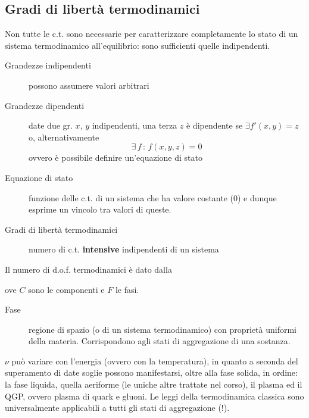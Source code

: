 \documentclass[10pt, oneside]{book}
\begin{document}
\subsection{Gradi di libertà termodinamici}
Non tutte le c.t. sono necessarie per caratterizzare completamente lo stato di un sistema termodinamico all'equilibrio: sono sufficienti quelle indipendenti.
\begin{description}
\item[Grandezze indipendenti] possono assumere valori arbitrari
\item[Grandezze dipendenti] date due gr. $x$, $y$ indipendenti, una terza $z$ è dipendente se $\exists f'(x,y) = z$ o, alternativamente
\[\exists \, f \, : \, f(x,y,z) = 0\]
ovvero è possibile definire un'equazione di stato
\item[Equazione di stato] funzione delle c.t. di un sistema che ha valore costante ($0$) e dunque esprime un vincolo tra valori di queste.
\item[Gradi di libertà termodinamici] numero di c.t. \textbf{intensive} indipendenti di un sistema
\end{description}
Il numero di d.o.f. termodinamici è dato dalla 
\begin{center}

\end{center}
ove $C$ sono le componenti e $F$ le fasi.
\begin{description}
\item[Fase] regione di spazio (o di un sistema termodinamico) con proprietà uniformi della materia. Corrispondono agli stati di aggregazione di una sostanza.
\end{description}
$\nu$ può variare con l'energia (ovvero con la temperatura), in quanto a seconda del superamento di date soglie possono manifestarsi, oltre alla fase solida, in ordine: la fase liquida, quella aeriforme (le uniche altre trattate nel corso), il plasma ed il QGP, ovvero plasma di quark e gluoni. Le leggi della termodinamica classica sono universalmente applicabili a tutti gli stati di aggregazione (!).
\end{document}
